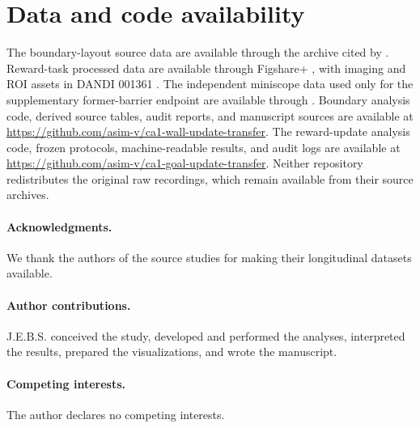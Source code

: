 \documentclass[10pt,twocolumn]{article}
\begin{document}
\section*{Data and code availability}

The boundary-layout source data are available through the archive cited by
\citet{LeeKeinathBrandon2024Dataset}. Reward-task processed data are available
through Figshare+ \citep{SosaEtAl2025Dataset}, with imaging and ROI assets in
DANDI 001361 \citep{SosaEtAl2025DANDI}. The independent miniscope data used
only for the supplementary former-barrier endpoint are available through
\citet{BlairData2023}. Boundary analysis code, derived source tables, audit
reports, and manuscript sources are available at
\url{https://github.com/asim-v/ca1-wall-update-transfer}. The reward-update
analysis code, frozen protocols, machine-readable results, and audit logs are
available at \url{https://github.com/asim-v/ca1-goal-update-transfer}. Neither
repository redistributes the original raw recordings, which remain available
from their source archives.

\paragraph*{Acknowledgments.}
We thank the authors of the source studies for making their longitudinal
datasets available.

\paragraph*{Author contributions.}
J.E.B.S. conceived the study, developed and performed the analyses, interpreted
the results, prepared the visualizations, and wrote the manuscript.

\paragraph*{Competing interests.}
The author declares no competing interests.

\setlength{\bibsep}{0pt}
\balance
\renewcommand{\bibfont}{\small}


\end{document}
